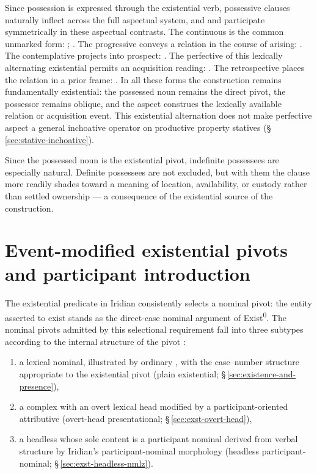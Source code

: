 Since possession is expressed through the existential verb, possessive clauses
naturally inflect across the full aspectual system, and  and
 participate symmetrically in these aspectual contrasts. The
continuous is the common unmarked form:  ;  . The
progressive conveys a relation in the course of arising:  . The contemplative projects into
prospect:  . The
perfective of this lexically alternating existential permits an acquisition
reading:
 . The retrospective places the
relation in a prior frame:  .
In all these forms the construction remains fundamentally existential: the
possessed noun remains the direct pivot, the possessor remains oblique, and the
aspect construes the lexically available relation or acquisition event.
This existential alternation does not make perfective aspect a general
inchoative operator on productive property statives
(§\,\ref{sec:stative-inchoative}).

Since the possessed noun is the existential pivot, indefinite possessees are
especially natural. Definite possessees are not excluded, but with them the
clause more readily shades toward a meaning of location, availability, or
custody rather than settled ownership --- a consequence of the existential
source of the construction.

\section{Event-modified existential pivots and participant introduction}\label{sec:existential-presentatives}

The existential predicate in Iridian consistently selects a nominal pivot: the
entity asserted to exist stands as the direct-case nominal argument of
Exist\textsuperscript{0}. The nominal pivots admitted by this selectional requirement fall into
three subtypes according to the internal structure of the pivot :

\begin{enumerate}[wide]
\item a lexical nominal, illustrated by ordinary , with the
  case--number structure appropriate to the existential pivot
  (plain existential; §\,\ref{sec:existence-and-presence}),
\item a complex  with an overt lexical head modified by a
  participant-oriented attributive (overt-head presentational;
  §\,\ref{sec:exst-overt-head}),
\item a headless  whose sole content is a participant nominal
  derived from verbal structure by Iridian's participant-nominal morphology
  (headless participant-nominal; §\,\ref{sec:exst-headless-nmlz}).
\end{enumerate}

